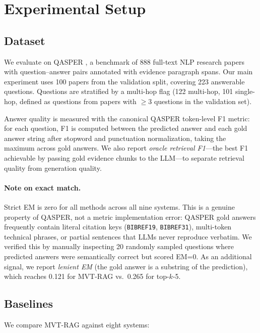 \documentclass[11pt,letterpaper]{article}
\begin{document}
\section{Experimental Setup}

\subsection{Dataset}

We evaluate on QASPER \citep{Dasigi2021}, a benchmark of 888 full-text NLP research papers with question--answer pairs
annotated with evidence paragraph spans. Our main experiment uses 100 papers from the validation split, covering 223
answerable questions. Questions are stratified by a multi-hop flag (122 multi-hop, 101 single-hop, defined as questions
from papers with $\geq$3 questions in the validation set).

Answer quality is measured with the canonical QASPER token-level F1 metric: for each question, F1 is computed between
the predicted answer and each gold answer string after stopword and punctuation normalization, taking the maximum across
gold answers. We also report \emph{oracle retrieval F1}---the best F1 achievable by passing gold evidence chunks to the
LLM---to separate retrieval quality from generation quality.

\paragraph{Note on exact match.} Strict EM is zero for all methods across all nine systems. This is a genuine property
of QASPER, not a metric implementation error: QASPER gold answers frequently contain literal citation keys
(\texttt{BIBREF19}, \texttt{BIBREF31}), multi-token technical phrases, or partial sentences that LLMs never reproduce
verbatim. We verified this by manually inspecting 20 randomly sampled questions where predicted answers were semantically
correct but scored EM=0. As an additional signal, we report \emph{lenient EM} (the gold answer is a substring of the
prediction), which reaches 0.121 for MVT-RAG vs.\ 0.265 for top-$k$-5.

\subsection{Baselines}

We compare MVT-RAG against eight systems:
\end{document}
